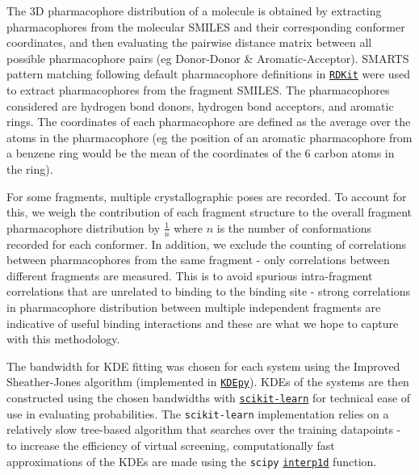 The 3D pharmacophore distribution of a molecule is obtained by extracting pharmacophores from the molecular SMILES and their corresponding conformer coordinates, and then evaluating the pairwise distance matrix between all possible pharmacophore pairs (eg Donor-Donor \& Aromatic-Acceptor). SMARTS pattern matching following default pharmacophore definitions in \href{https://www.rdkit.org/docs/index.html}{\texttt{RDKit}} were used to extract pharmacophores from the fragment SMILES. The pharmacophores considered are hydrogen bond donors, hydrogen bond acceptors, and aromatic rings. The coordinates of each pharmacophore are defined as the average over the atoms in the pharmacophore (eg the position of an aromatic pharmacophore from a benzene ring would be the mean of the coordinates of the 6 carbon atoms in the ring).

For some fragments, multiple crystallographic poses are recorded. To account for this, we weigh the contribution of each fragment structure to the overall fragment pharmacophore distribution by $\frac{1}{n}$ where $n$ is the number of conformations recorded for each conformer. In addition, we exclude the counting of correlations between pharmacophores from the same fragment - only correlations between different fragments are measured. This is to avoid spurious intra-fragment correlations that are unrelated to binding to the binding site - strong correlations in pharmacophore distribution between multiple independent fragments are indicative of useful binding interactions and these are what we hope to capture with this methodology.

The bandwidth for KDE fitting was chosen for each system using the Improved Sheather-Jones algorithm \cite{Botev2010ISJ} (implemented in \href{https://kdepy.readthedocs.io/en/latest/index.html}{\texttt{KDEpy}}). KDEs of the systems are then constructed using the chosen bandwidths with \href{https://scikit-learn.org/stable/}{\texttt{scikit-learn}} for technical ease of use in evaluating probabilities. The \texttt{scikit-learn} implementation relies on a relatively slow tree-based algorithm that searches over the training datapoints - to increase the efficiency of virtual screening, computationally fast approximations of the KDEs are made using the \texttt{scipy} \href{https://docs.scipy.org/doc/scipy/reference/generated/scipy.interpolate.interp1d.html#scipy.interpolate.interp1d}{\texttt{interp1d}} function.


